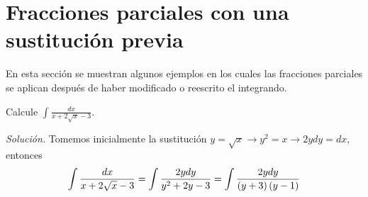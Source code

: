 


\section{Fracciones parciales con una sustitución previa}
En esta sección se muestran algunos ejemplos en los cuales las fracciones parciales se aplican después de haber modificado o reescrito el integrando.

\begin{ejemplo}
Calcule
{\small $\displaystyle{\int \frac{dx}{x+2\sqrt{x}-3}}$.}
\end{ejemplo}
\textit{Solución.} Tomemos inicialmente la sustitución {\small $y=\sqrt{x}\rightarrow y^{2}=x\rightarrow 2ydy=dx$,} entonces
{\small
\[
\int \frac{dx}{x+2\sqrt{x}-3}=\int \frac{2ydy}{y^{2}+2y-3}=\int \frac{2ydy}{%
\left( y+3\right) \left( y-1\right) }
\]
}

